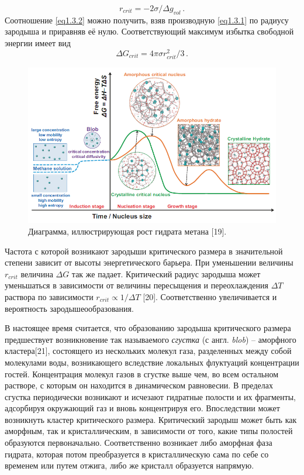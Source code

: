 \begin{equation}
    r_{crit} = -2\sigma/\Delta g_{vol} \,.
    \label{eq1.3.2}
\end{equation}
Соотношение \ref{eq1.3.2} можно получить, взяв производную \ref{eq1.3.1} по радиусу зародыша и приравняв её нулю. Соответствующий максимум избытка свободной энергии имеет вид
\begin{equation}
    \Delta G_{crit} = 4\pi\sigma r_{crit}^2 / 3 \,.
    \label{eq1.3.3}
\end{equation}

\begin{figure}[H] 
    \centering
    \includegraphics[width=.9\linewidth]{figures/hydrnucl.png}
    \caption{Диаграмма, иллюстрирующая рост гидрата метана [19].}
    \label{fig1.3.1}
\end{figure}

Частота с которой возникают зародыши критического размера в значительной степени зависит от высоты энергетического барьера. При уменьшении величины $r_{crit}$ величина $\Delta G$ так же падает. Критический радиус зародыша может уменьшаться в зависимости от величины пересыщения и переохлаждения $\Delta T$ раствора по зависимости $r_{crit} \propto 1/\Delta T$ [20]. Соответственно увеличивается и вероятность зародышеообразования. 

В настоящее время считается, что образованию зародыша критического размера предшествует возникновение так называемого \textit{сгустка} (с англ. \textit{blob}) -- аморфного кластера[21], состоящего из нескольких молекул газа, разделенных между собой молекулами воды, возникающего вследствие локальных флуктуаций концентрации гостей. Концентрация молекул газов в сгустке выше чем, во всем остальном растворе, с которым он находится в динамическом равновесии. В пределах сгустка периодически возникают и исчезают гидратные полости и их фрагменты, адсорбируя окружающий газ и вновь концентрируя его. Впоследствии может возникнуть кластер критического размера. Критический зародыш может быть как аморфным, так и кристаллическим, в зависимости от того, какие типы полостей образуются первоначально. Соответственно возникает либо аморфная фаза гидрата, которая потом преобразуется в кристаллическую сама по себе со временем или путем отжига, либо же кристалл образуется напрямую.